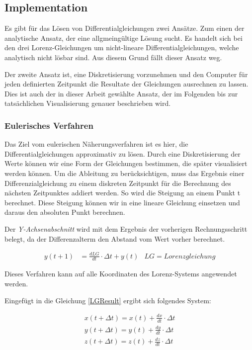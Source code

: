 \subsection{Implementation}
Es gibt für das Lösen von Differentialgleichungen zwei Ansätze. Zum einen der analytische Ansatz, der eine allgmeingültige Lösung sucht. Es handelt sich bei den drei Lorenz-Gleichungen um nicht-lineare Differentialgleichungen, welche analytisch nicht lösbar sind. Aus diesem Grund fällt dieser Ansatz weg. 

Der zweite Ansatz ist, eine Diskretisierung vorzunehmen und den Computer für jeden definierten Zeitpunkt die Resultate der Gleichungen ausrechnen zu lassen. Dies ist auch der in dieser Arbeit gewählte Ansatz, der im Folgenden bis zur tatsächlichen Visualisierung genauer beschrieben wird. 

\subsubsection{Eulerisches Verfahren}

Das Ziel vom eulerischen Näherungsverfahren ist es hier, die Differentialgleichungen approximativ zu lösen. Durch eine Diskretisierung der Werte können wir eine Form der Gleichungen bestimmen, die später visualisiert werden können. Um die Ableitung zu berücksichtigen, muss das Ergebnis einer Differenzialgleichung zu einem diskreten Zeitpunkt für die Berechnung des nächsten Zeitpunktes addiert werden. So wird die Steigung an einem Punkt t berechnet. Diese Steigung können wir in eine lineare Gleichung einsetzen und daraus den absoluten Punkt berechnen.

Der \textit{Y-Achsenabschnitt} wird mit dem Ergebnis der vorherigen Rechnungsschritt belegt, da der Differenzalterm den Abstand vom Wert vorher berechnet.  

\begin{align}
\label{LGResult}
y(t + 1) &= \frac{d LG}{d t} \cdot  \Delta t + y(t) & LG = Lorenzgleichung
\end{align}

Dieses Verfahren kann auf alle Koordinaten des Lorenz-Systems angewendet werden.

Eingefügt in die Gleichung \eqref{LGResult} ergibt sich folgendes System:

\begin{align}
x(t+\Delta t) = x(t) + \frac{dx}{dt} \cdot \Delta t\\
y(t + \Delta t) = y(t) + \frac{dy}{dt} \cdot \Delta t\\
z(t + \Delta t) = z(t) + \frac{dz}{dt} \cdot \Delta t
\end{align}

